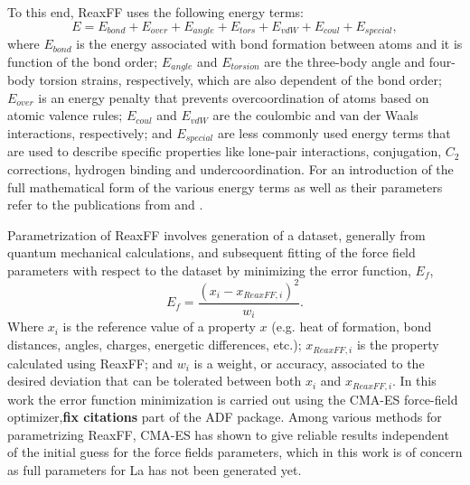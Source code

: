 \documentclass[journal=jpcafh,manuscript=article]{achemso}
\begin{document}
To this end, ReaxFF uses the following energy terms:
\begin{equation}
E = E_{bond} + E_{over} + E_{angle} + E_{tors} + E_{vdW} + E_{coul} + E_{special},
\end{equation}
where $E_{bond}$ is the energy associated with bond formation between atoms and it is function of the bond order; $E_{angle}$ and $E_{torsion}$ are the three-body angle and four-body torsion strains, respectively, which are also dependent of the bond order; $E_{over}$ is an energy penalty that prevents overcoordination of atoms based on atomic valence rules; $E_{coul}$ and $E_{vdW}$ are the coulombic and van der Waals interactions, respectively; and $E_{special}$ are less commonly used energy terms that are used to describe specific properties like lone-pair interactions, conjugation, $C_2$ corrections, hydrogen binding and undercoordination.
For an introduction of the full mathematical form of the various energy terms as well as their parameters refer to the publications from \citet{van2001reaxff} and \citet{chenoweth_reaxff_2008}.

Parametrization of ReaxFF involves generation of a dataset, generally from quantum mechanical calculations, and subsequent fitting of the force field parameters with respect to the dataset by minimizing the error function, $E_f$,
\begin{equation}
E_f = \frac{(x_{i} - x_{ReaxFF,i})^2}{w_i}.
\end{equation}
Where $x_{i}$ is the reference value of a property $x$ (e.g. heat of formation, bond distances, angles, charges, energetic differences, etc.); $x_{ReaxFF,i}$ is the property calculated using ReaxFF; and $w_i$ is a weight, or accuracy, associated to the desired deviation that can be tolerated between both $x_i$ and $x_{ReaxFF,i}$.
In this work the error function minimization is carried out using the CMA-ES force-field optimizer,\textbf{fix citations}\cite{iype_parameterization_2013} part of the ADF package.
Among various methods for parametrizing ReaxFF, CMA-ES has shown to give reliable results independent of the initial guess for the force fields parameters, which in this work is of concern as full parameters for La has not been generated yet.
\end{document}

